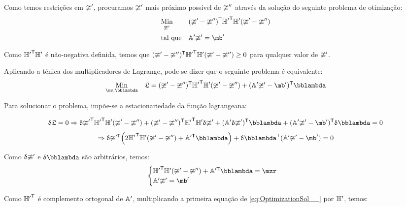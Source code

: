 \documentclass[a4paper,11pt,brazil,fleqn]{article}
\begin{document}
\begin{itemize}
Como temos restri\c{c}\~oes em $\mathbb{\upsilon}'$, procuramos $\mathbb{\upsilon}'$ mais pr\'oximo poss\'ivel de $\mathbb{\upsilon}''$ atrav\'es da solu\c{c}\~ao do seguinte problema de otimiza\c{c}\~ao:
\begin{equation} \label{eq:Optimization__}
\begin{aligned}
& \underset{\mup'}{\text{Min}}
& & (\mup' - \mup'')^\msT {\mH'}^\msT \mH' (\mup' - \mup'') \\
& \text{tal que}
& & \mA' \mup'  = \mb'
\end{aligned}
\end{equation}

Como ${\mathbb{H}'}^{\mathsf{T}} \mathbb{H}'$ \'e n\~ao-negativa definida, temos que $(\mathbb{\upsilon}' - \mathbb{\upsilon}'')^{\mathsf{T}} {\mathbb{H}'}^{\mathsf{T}} \mathbb{H}' (\mathbb{\upsilon}' - \mathbb{\upsilon}'') \geq 0 $ para qualquer valor de $\mathbb{\upsilon}'$.

Aplicando a t\'enica dos multiplicadores de Lagrange, pode-se dizer que o seguinte problema \'e equivalente:
\begin{equation}
\begin{aligned}
& \underset{\mv, \mlambda}{\text{Min}}
& & \mathfrak{L} = (\mup' - \mup'')^\msT {\mH'}^\msT \mH' (\mup' - \mup'') + (\mA' \mup'  - \mb')^\msT \mlambda \\
\end{aligned}
\end{equation}


Para solucionar o problema, imp\~oe-se a estacionariedade da fun\c{c}\~ao lagrangeana:

$$ \dl \mathfrak{L} = 0 \Rightarrow \dl {\mup'}^\msT {\mH'}^\msT \mH' (\mup' - \mup'') + (\mup' - \mup'')^\msT {\mH'}^\msT \mH' \dl \mup' + (\mA' \dl \mup')^\msT \mlambda + (\mA' \mup'  - \mb')^\msT \dl \mlambda = 0 $$
$$ \Rightarrow \dl \mup'^\msT \Big( 2 {\mH'}^\msT \mH' (\mup' - \mup'') + \mA'^\msT \mlambda \Big) + \dl \mlambda^\msT (\mA' \mup' - \mb') = 0 $$

Como ${\updelta} \mathbb{\upsilon}'$ e $\dl \mlambda$ s\~ao arbitr\'arios, temos:
\begin{equation} \label{eq:OptimizationSol__}
\begin{cases}
{\mH'}^\msT \mH' (\mup' - \mup'') + \mA'^\msT \mlambda = \mzr \\
\mA' \mup'  = \mb'
\end{cases}
\end{equation}

Como ${\mathbb{H}'}^{\mathsf{T}}$ \'e complemento ortogonal de $\mathbb{A}'$, multiplicando a primeira equa\c{c}\~ao de \eqref{eq:OptimizationSol__} por $\mathbb{H}'$, temos: \\


\end{itemize}
\end{document}
